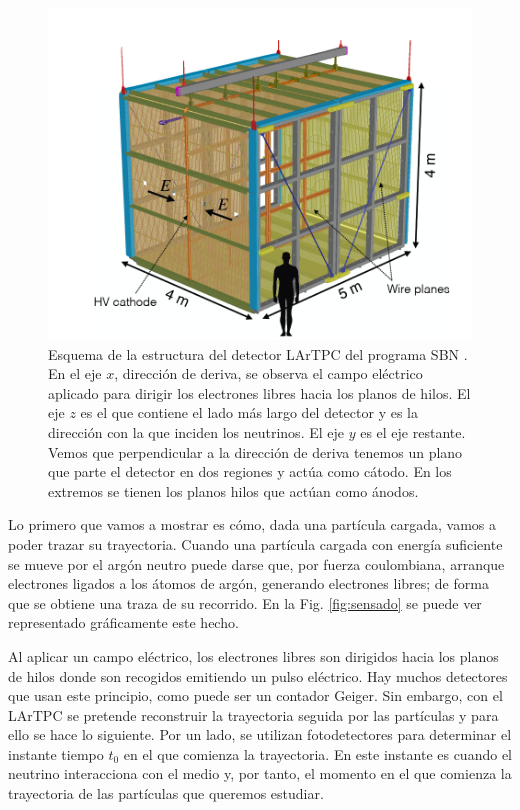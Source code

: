\documentclass[a4paper,12pt,oneside,titlepage]{book}
\begin{document}
\begin{figure}[h!]
  \centering
  \includegraphics[scale=0.45]{estructura_detector.PNG}
  \caption{Esquema de la estructura del detector LArTPC del programa SBN \cite{sbnd}. En el eje $x$, dirección de deriva, se observa el campo eléctrico aplicado para dirigir los electrones libres hacia los planos de hilos. El eje $z$ es el que contiene el lado más largo del detector y es la dirección con la que inciden los neutrinos. El eje $y$ es el eje restante. Vemos que perpendicular a la dirección de deriva tenemos un plano que parte el detector en dos regiones y actúa como cátodo. En los extremos se tienen los planos hilos que actúan como ánodos.}
  \label{fig:estructura_detector}
\end{figure}

Lo primero que vamos a mostrar es cómo, dada una partícula cargada, vamos a poder trazar su trayectoria. Cuando una partícula cargada con energía suficiente se mueve por el argón neutro puede darse que, por fuerza coulombiana, arranque  electrones ligados a los átomos de argón, generando electrones libres; de forma que se obtiene una traza de su recorrido. En la Fig. \ref{fig:sensado} se puede ver representado gráficamente este hecho.

Al aplicar un campo eléctrico, los electrones libres son dirigidos hacia los planos de hilos donde son recogidos emitiendo un pulso eléctrico. Hay muchos detectores que usan este principio, como puede ser un contador Geiger. Sin embargo, con el LArTPC se pretende reconstruir la trayectoria seguida por las partículas y para ello se hace lo siguiente. Por un lado, se utilizan fotodetectores para determinar el instante tiempo $t_0$ en el que comienza la trayectoria. En este instante es cuando el neutrino interacciona con el medio y, por tanto, el momento en el que comienza la trayectoria de las partículas que queremos estudiar. 
\end{document}
